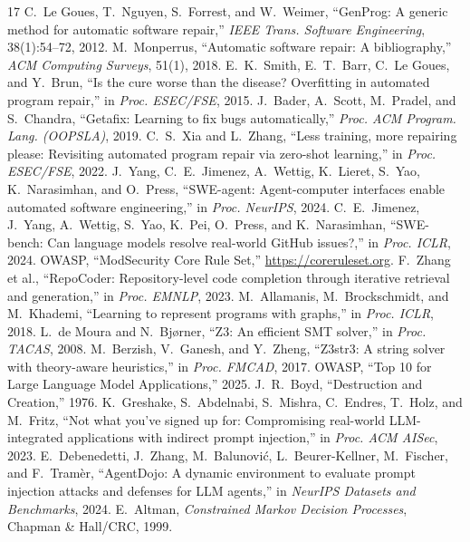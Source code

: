 \documentclass[10pt,a4paper]{article}
\begin{document}
\small
\begin{thebibliography}{17}
 C.~Le Goues, T.~Nguyen, S.~Forrest, and W.~Weimer, ``GenProg: A generic method for automatic software repair,'' \emph{IEEE Trans. Software Engineering}, 38(1):54--72, 2012.
 M.~Monperrus, ``Automatic software repair: A bibliography,'' \emph{ACM Computing Surveys}, 51(1), 2018.
 E.~K.~Smith, E.~T.~Barr, C.~Le Goues, and Y.~Brun, ``Is the cure worse than the disease? Overfitting in automated program repair,'' in \emph{Proc. ESEC/FSE}, 2015.
 J.~Bader, A.~Scott, M.~Pradel, and S.~Chandra, ``Getafix: Learning to fix bugs automatically,'' \emph{Proc. ACM Program. Lang. (OOPSLA)}, 2019.
 C.~S.~Xia and L.~Zhang, ``Less training, more repairing please: Revisiting automated program repair via zero-shot learning,'' in \emph{Proc. ESEC/FSE}, 2022.
 J.~Yang, C.~E.~Jimenez, A.~Wettig, K.~Lieret, S.~Yao, K.~Narasimhan, and O.~Press, ``SWE-agent: Agent-computer interfaces enable automated software engineering,'' in \emph{Proc. NeurIPS}, 2024.
 C.~E.~Jimenez, J.~Yang, A.~Wettig, S.~Yao, K.~Pei, O.~Press, and K.~Narasimhan, ``SWE-bench: Can language models resolve real-world GitHub issues?,'' in \emph{Proc. ICLR}, 2024.
 OWASP, ``ModSecurity Core Rule Set,'' \url{https://coreruleset.org}.
 F.~Zhang et al., ``RepoCoder: Repository-level code completion through iterative retrieval and generation,'' in \emph{Proc. EMNLP}, 2023.
 M.~Allamanis, M.~Brockschmidt, and M.~Khademi, ``Learning to represent programs with graphs,'' in \emph{Proc. ICLR}, 2018.
 L.~de Moura and N.~Bj{\o}rner, ``Z3: An efficient SMT solver,'' in \emph{Proc. TACAS}, 2008.
 M.~Berzish, V.~Ganesh, and Y.~Zheng, ``Z3str3: A string solver with theory-aware heuristics,'' in \emph{Proc. FMCAD}, 2017.
 OWASP, ``Top 10 for Large Language Model Applications,'' 2025.
 J.~R.~Boyd, ``Destruction and Creation,'' 1976.
 K.~Greshake, S.~Abdelnabi, S.~Mishra, C.~Endres, T.~Holz, and M.~Fritz, ``Not what you've signed up for: Compromising real-world LLM-integrated applications with indirect prompt injection,'' in \emph{Proc. ACM AISec}, 2023.
 E.~Debenedetti, J.~Zhang, M.~Balunovi\'c, L.~Beurer-Kellner, M.~Fischer, and F.~Tram\`er, ``AgentDojo: A dynamic environment to evaluate prompt injection attacks and defenses for LLM agents,'' in \emph{NeurIPS Datasets and Benchmarks}, 2024.
 E.~Altman, \emph{Constrained Markov Decision Processes}, Chapman \& Hall/CRC, 1999.
\end{thebibliography}
\end{document}
